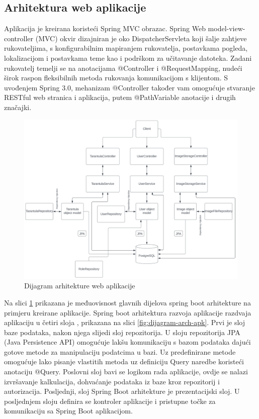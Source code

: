 \documentclass[a4paper,12pt,oneside]{article}
\begin{document}
\subsection{Arhitektura web aplikacije}

Aplikacija je kreirana koristeći Spring MVC obrazac. Spring Web model-view-controller (MVC) okvir dizajniran je oko DispatcherServleta koji šalje zahtjeve rukovateljima, s konfigurabilnim mapiranjem rukovatelja, postavkama pogleda, lokalizacijom i postavkama teme kao i podrškom za učitavanje datoteka. Zadani rukovatelj temelji se na anotacijama @Controller i @RequestMapping, nudeći širok raspon fleksibilnih metoda rukovanja komunikacijom s klijentom. S uvođenjem Spring 3.0, mehanizam @Controller također vam omogućuje stvaranje RESTful web stranica i aplikacija, putem @PathVariable anotacije i drugih značajki.\cite{spring-mvc-url} 


\begin{figure}
    \centering
    \includegraphics[width=1\linewidth]{Slike/AppArchitecture.png}
    \caption{Dijagram arhitekture web aplikacije}
    \label{fig:app-architecture}
\end{figure}

Na slici \ref{fig:app-architecture} prikazana je međuovisnost glavnih dijelova spring boot arhitekture na primjeru kreirane aplikacije. Spring boot arhitektura razvoja aplikacije razdvaja aplikaciju u četiri sloja , prikazana na slici \ref{fig:dijagram-arch-apk}. Prvi je sloj baze podataka, nakon njega slijedi sloj repozitorija. U sloju repozitorija JPA (Java Persistence API) omogućuje lakšu komunikaciju s bazom podataka dajući gotove metode za manipulaciju podatcima u bazi. Uz predefinirane metode omogućuje lako pisanje vlastitih metoda uz definiciju Query naredbe koristeći anotaciju @Query. Poslovni sloj bavi se logikom rada aplikacije, ovdje se nalazi izvršavanje kalkulacija, dohvaćanje podataka iz baze kroz repozitorij i autorizacija. Posljednji, sloj Spring Boot arhitekture je prezentacijski sloj. U posljednjem sloju definira se kontroler aplikacije i pristupne točke za komunikaciju sa Spring Boot aplikacijom.
\end{document}
